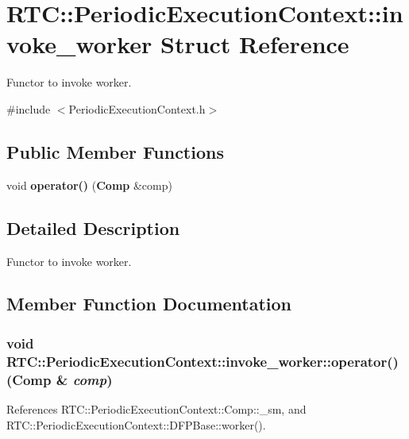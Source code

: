 \section{RTC::PeriodicExecutionContext::invoke\_\-worker Struct Reference}
\label{structRTC_1_1PeriodicExecutionContext_1_1invoke__worker}


Functor to invoke worker.  




{\ttfamily \#include $<$PeriodicExecutionContext.h$>$}

\subsection*{Public Member Functions}
\begin{DoxyCompactItemize}
\item 
void {\bf operator()} ({\bf Comp} \&comp)
\end{DoxyCompactItemize}


\subsection{Detailed Description}
Functor to invoke worker. 

\subsection{Member Function Documentation}
\subsubsection[{operator()}]{\setlength{\rightskip}{0pt plus 5cm}void RTC::PeriodicExecutionContext::invoke\_\-worker::operator() ({\bf Comp} \& {\em comp})\hspace{0.3cm}{\ttfamily  [inline]}}\label{structRTC_1_1PeriodicExecutionContext_1_1invoke__worker_ab7b7faf3e55941e7829e36d1a86cc211}


References RTC::PeriodicExecutionContext::Comp::\_\-sm, and RTC::PeriodicExecutionContext::DFPBase::worker().


